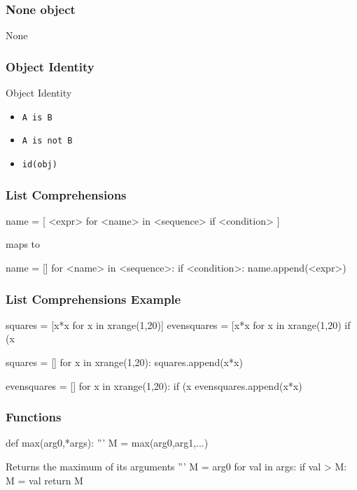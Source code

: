 \begin{frame}[fragile]
\frametitle{None object}

\begin{python}
None
\end{python}
\end{frame}

\begin{frame}[fragile]
\frametitle{Object Identity}

\begin{block}{Object Identity}
\begin{itemize}
\item \lstinline{A is B}
\item \lstinline{A is not B}
\item \lstinline{id(obj)}
\end{itemize}
\end{block}

\end{frame}

\begin{frame}[fragile]
\frametitle{List Comprehensions}

\begin{python}
name = [ <expr> for <name> in <sequence> if <condition> ]
\end{python}

maps to

\begin{python}
name = []
for <name> in <sequence>:
    if <condition>:
        name.append(<expr>)
\end{python}

\end{frame}

\begin{frame}[fragile]
\frametitle{List Comprehensions Example}

\begin{python}
squares = [x*x for x in xrange(1,20)]
evensquares = [x*x for x in xrange(1,20) if (x%
\end{python}

\begin{python}
squares = []
for x in xrange(1,20):
    squares.append(x*x)

evensquares = []
for x in xrange(1,20):
    if (x%
        evensquares.append(x*x)
\end{python}

\end{frame}

\begin{frame}[fragile]
\frametitle{Functions}

\begin{python}
def max(arg0,*args):
    '''
    M = max(arg0,arg1,...)

    Returns the maximum of its arguments
    '''
    M = arg0
    for val in args:
        if val > M:
            M = val
    return M
\end{python}

\end{frame}


